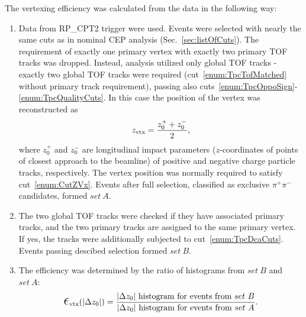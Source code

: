 The vertexing efficiency was calculated from the data in the following way:
\begin{enumerate}
\item Data from RP\_CPT2 trigger were used. Events were selected with nearly the same cuts as in nominal CEP analysis (Sec.~\ref{sec:listOfCuts}). The requirement of exactly one primary vertex with exactly two primary TOF tracks was dropped. Instead, analysis utilized only global TOF tracks - exactly two global TOF tracks were required (cut~\ref{enum:TpcTofMatched} without primary track requirement), passing also cuts~\ref{enum:TpcOppoSign}-\ref{enum:TpcQualityCuts}. In this case the position of the vertex was reconstructed as\vspace*{-10pt}
\begin{equation}
 z_{\text{vtx}} = \frac{z_{0}^{+}+z_{0}^{-}}{2},\vspace*{-5pt}
\end{equation}
where $z_{0}^{+}$ and $z_{0}^{-}$ are longitudinal impact parameters ($z$-coordinates of points of closest approach to the beamline) of positive and negative charge particle tracks, respectively. The vertex position was normally required to satisfy cut~\ref{enum:CutZVx}. Events after full selection, classified as exclusive $\pi^{+}\pi^{-}$ candidates, formed $set~A$.

\item The two global TOF tracks were checked if they have associated primary tracks, and the two primary tracks are assigned to the same primary vertex. If yes, the tracks were additionally subjected to cut~\ref{enum:TpcDcaCuts}. Events passing descibed selection formed $set~B$.

	\item The efficiency was determined by the ratio of histograms from $set~B$ and $set~A$:
	\begin{equation}\label{eq:vertexingEffDef}
 \mbox{\LARGE$\epsilon$}_{\text{vtx}}(|\Delta z_{0}|) = \frac{|\Delta z_{0}|~\text{histogram for events from}~set~B}{|\Delta z_{0}|~\text{histogram for events from}~set~A}.
  \end{equation}
\end{enumerate}

